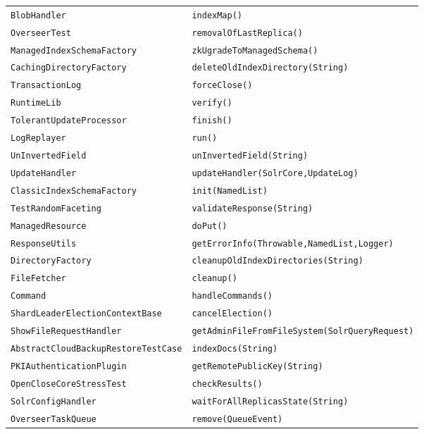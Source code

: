 \begin{center}
\begin{longtable}{ll}
 \lstinline/BlobHandler/&{\lstinline/indexMap()/}\\
 \lstinline/OverseerTest/&{\lstinline/removalOfLastReplica()/}\\
 \lstinline/ManagedIndexSchemaFactory/&{\lstinline/zkUgradeToManagedSchema()/}\\
 \lstinline/CachingDirectoryFactory/&{\lstinline/deleteOldIndexDirectory(String)/}\\
 \lstinline/TransactionLog/&{\lstinline/forceClose()/}\\
 \lstinline/RuntimeLib/&{\lstinline/verify()/}\\
 \lstinline/TolerantUpdateProcessor/&{\lstinline/finish()/}\\
 \lstinline/LogReplayer/&{\lstinline/run()/}\\
 \lstinline/UnInvertedField/&{\lstinline/unInvertedField(String)/}\\
 \lstinline/UpdateHandler/&{\lstinline/updateHandler(SolrCore,UpdateLog)/}\\
 \lstinline/ClassicIndexSchemaFactory/&{\lstinline/init(NamedList)/}\\
 \lstinline/TestRandomFaceting/&{\lstinline/validateResponse(String)/}\\
 \lstinline/ManagedResource/&{\lstinline/doPut()/}\\
 \lstinline/ResponseUtils/&{\lstinline/getErrorInfo(Throwable,NamedList,Logger)/}\\
 \lstinline/DirectoryFactory/&{\lstinline/cleanupOldIndexDirectories(String)/}\\
 \lstinline/FileFetcher/&{\lstinline/cleanup()/}\\
 \lstinline/Command/&{\lstinline/handleCommands()/}\\
 \lstinline/ShardLeaderElectionContextBase/&{\lstinline/cancelElection()/}\\
 \lstinline/ShowFileRequestHandler/&{\lstinline/getAdminFileFromFileSystem(SolrQueryRequest)/}\\
 \lstinline/AbstractCloudBackupRestoreTestCase/&{\lstinline/indexDocs(String)/}\\
 \lstinline/PKIAuthenticationPlugin/&{\lstinline/getRemotePublicKey(String)/}\\
 \lstinline/OpenCloseCoreStressTest/&{\lstinline/checkResults()/}\\
 \lstinline/SolrConfigHandler/&{\lstinline/waitForAllReplicasState(String)/}\\
 \lstinline/OverseerTaskQueue/&{\lstinline/remove(QueueEvent)/}\\

\end{longtable}
\end{center}
